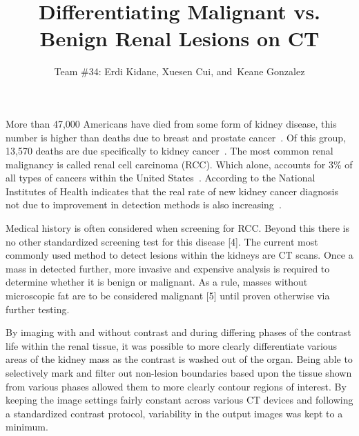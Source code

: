 \documentclass[10pt,journal,compsoc]{IEEEtran}
\begin{document}
\title{Differentiating Malignant vs. Benign Renal Lesions on CT
}  %

\author{Team \#34: Erdi Kidane,
        Xuesen Cui,
        and~Keane Gonzalez}  %

\maketitle


\IEEEPARstart
{M}{ore} than 47,000 Americans have died from some form of kidney disease, this number is higher than deaths due to breast and prostate cancer~\cite{cite1}. Of this group, 13,570 deaths are due specifically to kidney cancer~\cite{cite2}.  The most common renal malignancy is called renal cell carcinoma (RCC).  Which alone, accounts for 3\% of all types of cancers within the United States~\cite{cite3}. According to the National Institutes of Health indicates that the real rate of new kidney cancer diagnosis not due to improvement in detection methods is also increasing~\cite{cite3}.

Medical history is often considered when screening for RCC.  Beyond this there is no other standardized screening test for this disease [4].  The current most commonly used method to detect lesions within the kidneys are CT scans.  Once a mass in detected further, more invasive and expensive analysis is required to determine whether it is benign or malignant.  As a rule, masses without microscopic fat are to be considered malignant [5] until proven otherwise via further testing. 

By imaging with and without contrast and during differing phases of the contrast life within the renal tissue, it was possible to more clearly differentiate various areas of the kidney mass as the contrast is washed out of the organ. Being able to selectively mark and filter out non-lesion boundaries based upon the tissue shown from various phases allowed them to more clearly contour regions of interest. By keeping the image settings fairly constant across various CT devices and following a standardized contrast protocol, variability in the output images was kept to a minimum. 
\end{document}
